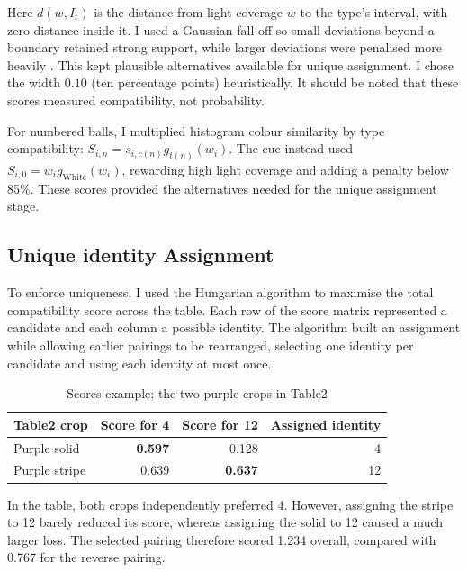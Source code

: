 \documentclass[12pt,a4paper]{article}
\begin{document}

Here \(d(w,I_t)\) is the distance from light coverage \(w\) to the type’s interval, 
with zero distance inside it. I used a Gaussian fall-off so small deviations beyond 
a boundary retained strong support, while larger deviations were penalised more heavily 
\cite{rbf,gauss2mf}. This kept plausible alternatives available for unique assignment. 
I chose the width \(0.10\) (ten percentage points) heuristically. It should be noted that these scores measured 
compatibility, not probability.

For numbered balls, I multiplied histogram colour similarity by type compatibility: 
\(S_{i,n}=s_{i,c(n)}g_{t(n)}(w_i)\). The cue instead used \(S_{i,0}=w_i g_{\mathrm{White}}(w_i)\),
rewarding high light coverage and adding a penalty below 85\%. 
These scores provided the alternatives needed for the unique assignment stage.

\subsection{Unique identity Assignment}
To enforce uniqueness, I used the Hungarian algorithm \cite{hungarian} to maximise the total compatibility score 
across the table. Each row of the score matrix represented a candidate and each column a possible 
identity. The algorithm built an assignment while allowing earlier pairings to be rearranged, 
selecting one identity per candidate and using each identity at most once.

\begin{table}[H]
\centering
\begin{tabular}{lrrr}
\toprule
Table2 crop & Score for 4 & Score for 12 & Assigned identity \\
\midrule
Purple solid  & \textbf{0.597} & 0.128          & 4  \\
Purple stripe & 0.639          & \textbf{0.637} & 12 \\
\bottomrule
\end{tabular}
\caption{Scores example; the two purple crops in Table2}
\end{table}
In the table, both crops independently preferred 4. However, assigning the stripe to 12 barely reduced its score, 
whereas assigning the solid to 12 caused a much larger loss. The selected pairing therefore scored 
1.234 overall, compared with 0.767 for the reverse pairing.
\end{document}
